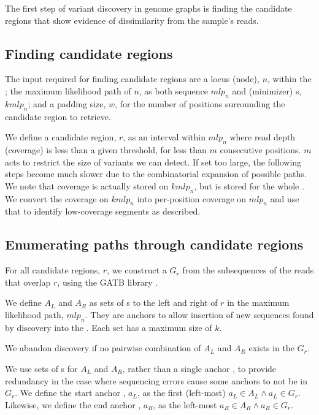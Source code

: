 The first step of \denovo{} variant discovery in genome graphs is finding the candidate regions that show evidence of dissimilarity from the sample's reads.

\subsection{Finding candidate regions}
\label{sec:denovo-candidate-regions}

The input required for finding candidate regions are a locus \prg{} (node), $n$, within the \pandora{} \panrg{}; the maximum likelihood path of $n$, as both sequence $mlp_n$ and (minimizer) \kmer{}s, $kmlp_n$; and a padding size, $w$, for the number of positions surrounding the candidate region to retrieve.

We define a candidate region, $r$, as an interval within $mlp_n$ where read depth (coverage) is less than a given threshold, for less than $m$ consecutive positions. $m$ acts to restrict the size of variants we can detect. If set too large, the following steps become much slower due to the combinatorial expansion of possible paths. We note that coverage is actually stored on $kmlp_n$, but is stored for the whole \kmer{}. We convert the coverage on $kmlp_n$ into per-position coverage on $mlp_n$ and use that to identify low-coverage segments as described.  

\subsection{Enumerating paths through candidate regions}
\label{sec:path-enum}

For all candidate regions, $r$, we construct a \dbg{} $G_r$ from the subsequences of the reads that overlap $r$, using the GATB library \cite{gatb2014}. 

We define $A_L$ and $A_R$ as sets of \kmer{}s to the left and right of $r$ in the maximum likelihood path, $mlp_n$. They are anchors to allow insertion of new sequences found by \denovo{} discovery into the \prg{}. Each set has a maximum size of $k$.

We abandon \denovo{} discovery if no pairwise combination of $A_L$ and $A_R$ exists in the \dbg{} $G_r$.

We use sets of \kmer{}s for $A_L$ and $A_R$, rather than a single anchor \kmer{}, to provide redundancy in the case where sequencing errors cause some anchors to not be in $G_r$. We define the start anchor \kmer{}, $a_L$, as the first (left-most) $a_L \in A_L \land a_L \in G_r$. Likewise, we define the end anchor \kmer{}, $a_R$, as the left-most $a_R \in A_R \land a_R \in G_r$.

